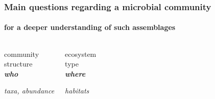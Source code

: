 \documentclass{beamer}
\begin{document}



   \begin{frame}
      \frametitle{Main questions regarding a microbial community}
      \framesubtitle{for a deeper understanding of such assemblages}
      \begin{singlespace}


         \begin{columns}[onlytextwidth]
            

               \begin{center}

                  community \\ structure   \\ \textbf{\textit{who}}  

                  \hrulefill

                  \scriptsize \textit{taxa, abundance}

               \end{center}



               \begin{center}

                  ecosystem \\ type  \\ \textbf{\textit{where}}

                  \hrulefill

                  \scriptsize \textit{habitats}


\end{center}
\end{columns}
\end{singlespace}
\end{frame}
\end{document}
